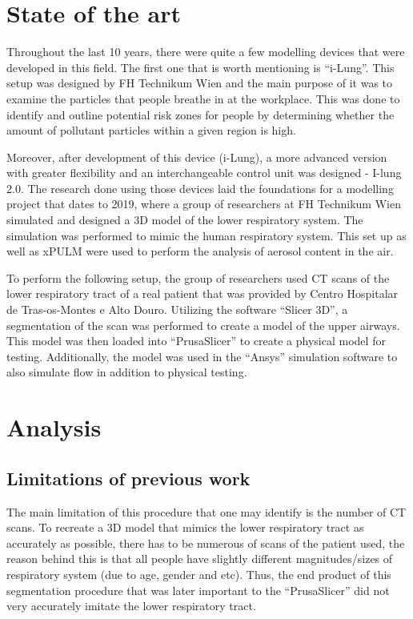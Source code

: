\documentclass[MME,Projekt,english]{twbook}%
\begin{document}
\section{State of the art}

Throughout the last 10 years, there were quite a few modelling devices that were developed in this field. The first one that is worth mentioning is “i-Lung”\cite{ilungconf}. This setup was designed by FH Technikum Wien and the main purpose of it was to examine the particles that people breathe in at the workplace. This was done to identify and outline potential risk zones for people by determining whether the amount of pollutant particles within a given region is high. \cite{ilungorf}

Moreover, after development of this device (i-Lung), a more advanced version with greater flexibility and an interchangeable control unit was designed - I-lung 2.0. The research done using those devices laid the foundations for a modelling project that dates to 2019, where a group of researchers at FH Technikum Wien simulated and designed a 3D model of the lower respiratory system. The simulation was performed to mimic the human respiratory system. This set up as well as xPULM were used to perform the analysis of aerosol content in the air. \cite{breathingpatterns}

To perform the following setup, the group of researchers used CT scans of the lower respiratory tract of a real patient that was provided by Centro Hospitalar de Tras-os-Montes e Alto Douro. Utilizing the software “Slicer 3D”, a segmentation of the scan was performed to create a model of the upper airways. This model was then loaded into “PrusaSlicer” to create a physical model for testing. Additionally, the model was used in the “Ansys” simulation software to also simulate flow in addition to physical testing.


\section{Analysis}

\subsection{Limitations of previous work}
The main limitation of this procedure that one may identify is the number of CT scans. To recreate a 3D model that mimics the lower respiratory tract as accurately as possible, there has to be numerous of scans of the patient used, the reason behind this is that all people have slightly different magnitudes/sizes of respiratory system (due to age, gender and etc). Thus, the end product of this segmentation procedure that was later important to the “PrusaSlicer” did not very accurately imitate the lower respiratory tract.  
\end{document}
